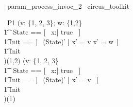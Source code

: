 \begin{zsection}
  \SECTION\ param\_process\_invoc\_2 \parents\ circus\_toolkit
\end{zsection}

\begin{circus}
    \circprocess\ P1 \circdef (v: \{1, 2, 3\}; w: \{1,2\} \circspot \circbegin  \\
    	\t1 \circstate\ State == [~ x:\nat | true ~] \\
    	\t1	Init == [~ (State)' | x' = v \lor x' = w~] \\
        \t1 \circspot \lschexpract Init \rschexpract \circseq \Skip \\
    \circend)(1,2) 
    \interleave 
    (v: \{1, 2, 3\} \circspot \circbegin  \\
    	\t1 \circstate\ State == [~ x:\nat | true ~] \\
    	\t1	Init == [~ (State)' | x' = v ~] \\
        \t1 \circspot \lschexpract Init \rschexpract \circseq \Skip \\
    \circend)(1) \\
\end{circus}
